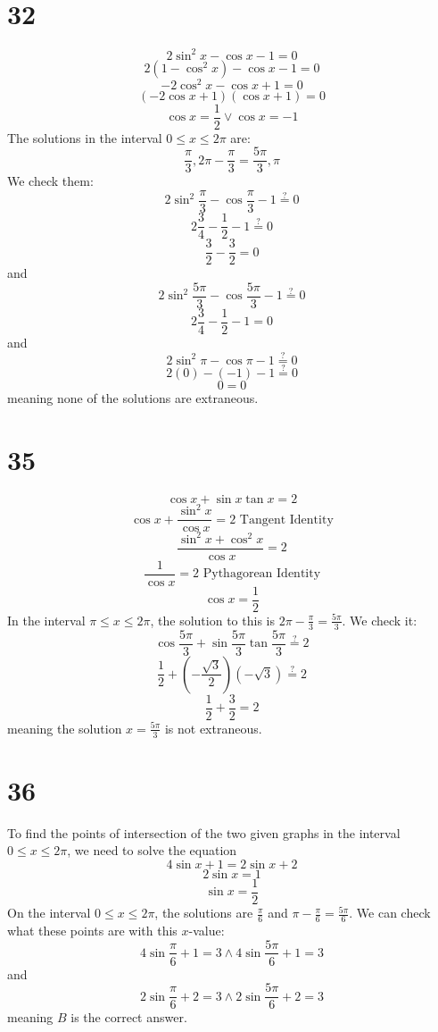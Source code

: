 \documentclass{article}
\theoremstyle{definition}
\newcommand{\?}{\stackrel{?}{=}}
\begin{document}
\section*{32}
\[ 2\sin^2 x-\cos x-1=0 \]
\[ 2(1-\cos^2 x)-\cos x-1=0 \]
\[ -2\cos^2 x-\cos x+1=0 \]
\[ (-2\cos x+1)(\cos x+1)=0 \]
\[ \cos x=\frac{1}{2}\vee\cos x=-1 \]
The solutions in the interval $0\le x\le 2\pi$ are:
\[ \frac{\pi}{3},2\pi-\frac{\pi}{3}=\frac{5\pi}{3},\pi \]
We check them:
\[ 2\sin^2\frac{\pi}{3}-\cos\frac{\pi}{3}-1\? 0 \]
\[ 2\frac{3}{4}-\frac{1}{2}-1\? 0 \]
\[ \frac{3}{2}-\frac{3}{2}=0 \]
and
\[ 2\sin^2\frac{5\pi}{3}-\cos\frac{5\pi}{3}-1\? 0 \]
\[ 2\frac{3}{4}-\frac{1}{2}-1=0 \]
and
\[ 2\sin^2\pi-\cos\pi-1\? 0 \]
\[ 2(0)-(-1)-1\? 0 \]
\[ 0=0 \]
meaning none of the solutions are extraneous.

\section*{35}
\[ \cos x+\sin x\tan x=2 \]
\[ \cos x+\frac{\sin^2 x}{\cos x}=2\textrm{ Tangent Identity} \]
\[ \frac{\sin^2 x+\cos^2 x}{\cos x}=2 \]
\[ \frac{1}{\cos x}=2\textrm{ Pythagorean Identity} \]
\[ \cos x=\frac{1}{2} \]
In the interval $\pi\le x\le 2\pi$, the solution to this is $2\pi-\frac{\pi}{3}=\frac{5\pi}{3}$. We check it:
\[ \cos\frac{5\pi}{3}+\sin\frac{5\pi}{3}\tan\frac{5\pi}{3}\? 2 \]
\[ \frac{1}{2}+(-\frac{\sqrt{3}}{2})(-\sqrt{3})\? 2 \]
\[ \frac{1}{2}+\frac{3}{2}=2 \]
meaning the solution $x=\frac{5\pi}{3}$ is not extraneous.

\section*{36}
To find the points of intersection of the two given graphs in the interval $0\le x\le 2\pi$, we need to solve the equation
\[ 4\sin x+1=2\sin x+2 \]
\[ 2\sin x=1 \]
\[ \sin x=\frac{1}{2} \]
On the interval $0\le x\le 2\pi$, the solutions are $\frac{\pi}{6}$ and $\pi-\frac{\pi}{6}=\frac{5\pi}{6}$. We can check what these points are with this $x$-value:
\[ 4\sin\frac{\pi}{6}+1=3\wedge 4\sin\frac{5\pi}{6}+1=3 \] and 
\[ 2\sin\frac{\pi}{6}+2=3\wedge 2\sin\frac{5\pi}{6}+2=3 \] meaning $B$ is the correct answer.
\end{document}
